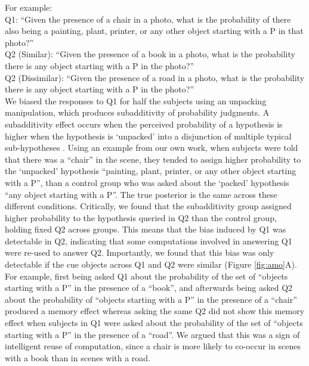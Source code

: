 For example: \\
Q1: ``Given the presence of a chair in a photo, what is the probability of there also being a painting, plant, printer, or any other object starting with a P in that photo?''\\
Q2 (Similar): ``Given the presence of a book in a photo, what is the probability there is any object starting with a P in the photo?''\\
Q2 (Dissimilar): ``Given the presence of a road in a photo, what is the probability there is any object starting with a P in the photo?''\\

We biased the responses to Q1 for half the subjects using an unpacking manipulation, which produces subadditivity of probability judgments. A subadditivity effect occurs when the perceived probability of a hypothesis is higher when the hypothesis is `unpacked' into a disjunction of multiple typical sub-hypotheses \citep{fox1998belief,tversky1994support,dasgupta2017hypotheses}. Using an example from our own work, when subjects were told that there was a ``chair'' in the scene, they tended to assign higher probability to the `unpacked' hypothesis ``painting, plant, printer, or any other object starting with a P'', than a control group who was asked about the `packed' hypothesis ``any object starting with a P''. The true posterior is the same across these different conditions. Critically, we found that the subadditivity group assigned higher probability to the hypothesis queried in Q2 than the control group, holding fixed Q2 across groups. This means that the bias induced by Q1 was detectable in Q2, indicating that some computations involved in answering Q1 were re-used to answer Q2. Importantly, we found that this bias was only detectable if the cue objects across Q1 and Q2 were similar (Figure \ref{fig:amo}A). 
For example, first being asked Q1 about the probability of the set of ``objects starting with a P'' in the presence of a ``book'', and afterwards being asked Q2 about the probability of ``objects starting with a P'' in the presence of a ``chair'' produced a memory effect whereas asking the same Q2 did not show this memory effect when subjects in Q1 were asked about the probability of the set of ``objects starting with a P'' in the presence of a ``road''. We argued that this was a sign of intelligent reuse of computation, since a chair is more likely to co-occur in scenes with a book than in scenes with a road.


